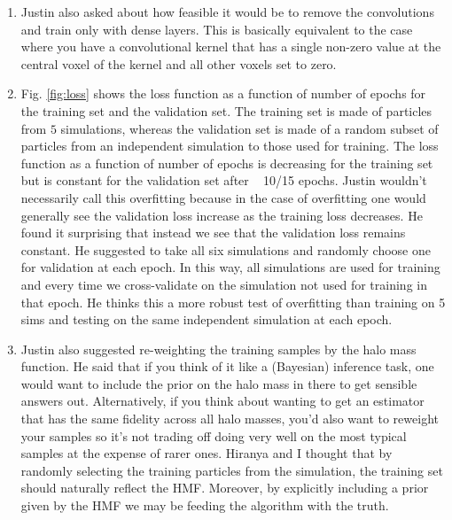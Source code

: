 \documentclass[11pt]{article}
\begin{document}
\begin{enumerate}
\item Justin also asked about how feasible it would be to remove the convolutions and train only with dense layers. This is basically equivalent to the case where you have a convolutional kernel that has a single non-zero value at the central voxel of the kernel and all other voxels set to zero.
\item Fig. \ref{fig:loss} shows the loss function as a function of number of epochs for the training set and the validation set. The training set is made of particles from $5$ simulations, whereas the validation set is made of a random subset of particles from an independent simulation to those used for training. The loss function as a function of number of epochs is decreasing for the training set but is constant for the validation set after ~ 10/15 epochs. Justin wouldn’t necessarily call this overfitting because in the case of overfitting one would generally see the validation loss increase as the training loss decreases. He found it surprising that instead we see that the validation loss remains constant. He suggested to take all six simulations and randomly choose one for validation at each epoch. In this way, all simulations are used for training and every time we cross-validate on the simulation not used for training in that epoch. He thinks this a more robust test of overfitting than training on 5 sims and testing on the same independent simulation at each epoch.
\item Justin also suggested re-weighting the training samples by the halo mass function. He said that if you think of it like a (Bayesian) inference task, one would want to include the prior on the halo mass in there to get sensible answers out. 
Alternatively, if you think about wanting to get an estimator that has the same fidelity across all halo masses, you’d also want to reweight your samples so it’s not trading off doing very well on the most typical samples at the expense of rarer ones. Hiranya and I thought that by randomly selecting the training particles from the simulation, the training set should naturally reflect the HMF. Moreover, by explicitly including a prior given by the HMF we may be feeding the algorithm with the truth.
\end{enumerate}
\end{document}
